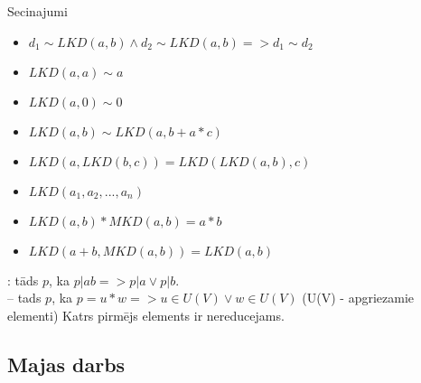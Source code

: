 Secinajumi

\begin{itemize}
  \item $d_1 \sim LKD(a, b) \wedge d_2 \sim LKD (a, b) => d_1 \sim d_2$
  \item $LKD (a, a) \sim a$
  \item $LKD (a, 0) \sim 0$
  \item $LKD (a, b) \sim LKD( a, b + a * c) $ 
  \item $LKD(a, LKD(b, c)) = LKD(LKD(a, b), c)$
  \item $LKD(a_1, a_2, ..., a_n)$
  \item $LKD(a, b) * MKD(a, b) = a * b$
  \item $LKD (a + b, MKD(a, b))= LKD(a,b)$
\end{itemize}

: tāds $p$, ka $p | ab => p|a \vee p | b$. \\
 -- tads $p$, ka $p = u * w => u \in U(V) \vee w \in U(V)$ (U(V) - apgriezamie elementi)
Katrs pirmējs elements ir nereducejams.

\subsection{Majas darbs}






